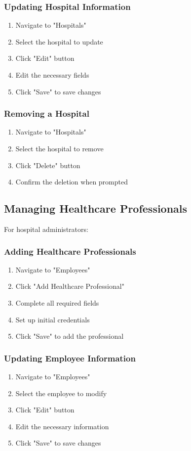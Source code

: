 \documentclass[12pt, titlepage]{article}
\begin{document}
\subsubsection{Updating Hospital Information}
\begin{enumerate}
\item Navigate to "Hospitals"
\item Select the hospital to update
\item Click "Edit" button
\item Edit the necessary fields
\item Click "Save" to save changes
\end{enumerate}

\subsubsection{Removing a Hospital}
\begin{enumerate}
\item Navigate to "Hospitals"
\item Select the hospital to remove
\item Click "Delete" button
\item Confirm the deletion when prompted
\end{enumerate}

\subsection{Managing Healthcare Professionals}
For hospital administrators:

\subsubsection{Adding Healthcare Professionals}
\begin{enumerate}
\item Navigate to "Employees"
\item Click "Add Healthcare Professional"
\item Complete all required fields
\item Set up initial credentials
\item Click "Save" to add the professional
\end{enumerate}

\subsubsection{Updating Employee Information}
\begin{enumerate}
\item Navigate to "Employees"
\item Select the employee to modify
\item Click "Edit" button
\item Edit the necessary information
\item Click "Save" to save changes
\end{enumerate}
\end{document}
